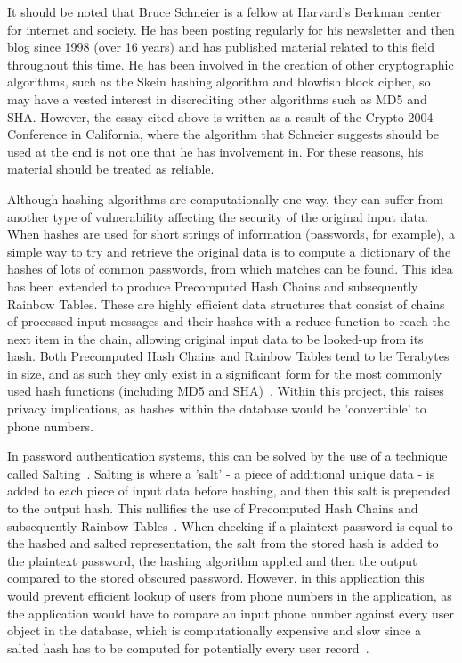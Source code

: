 \documentclass[authoryearcitations]{UoYCSproject}
\begin{document}
It should be noted that Bruce Schneier is a fellow at Harvard's Berkman center for internet and society.  He has been posting regularly for his newsletter and then blog since 1998 (over 16 years) and has published material related to this field throughout this time.  He has been involved in the creation of other cryptographic algorithms, such as the Skein hashing algorithm and blowfish block cipher, so may have a vested interest in discrediting other algorithms such as MD5 and SHA.  However, the essay cited above is written as a result of the Crypto 2004 Conference in California, where the algorithm that Schneier suggests should be used at the end is not one that he has involvement in.  For these reasons, his material should be treated as reliable.

Although hashing algorithms are computationally one-way, they can suffer from another type of vulnerability affecting the security of the original input data.  When hashes are used for short strings of information (passwords, for example), a simple way to try and retrieve the original data is to compute a dictionary of the hashes of lots of common passwords, from which matches can be found.  This idea has been extended to produce Precomputed Hash Chains and subsequently Rainbow Tables.  These are highly efficient data structures that consist of chains of processed input messages and their hashes with a reduce function to reach the next item in the chain, allowing original input data to be looked-up from its hash.  Both Precomputed Hash Chains and Rainbow Tables tend to be Terabytes in size, and as such they only exist in a significant form for the most commonly used hash functions (including MD5 and SHA)~\cite{Teat:2011:SCH:2016039.2016072}.  Within this project, this raises privacy implications, as hashes within the database would be 'convertible' to phone numbers.

In password authentication systems, this can be solved by the use of a technique called Salting~\cite{hashingPasswordsInfoSec}.  Salting is where a 'salt' - a piece of additional unique data - is added to each piece of input data before hashing, and then this salt is prepended to the output hash.  This nullifies the use of Precomputed Hash Chains and subsequently Rainbow Tables~\cite{hashingPasswordsInfoSec}. When checking if a plaintext password is equal to the hashed and salted representation, the salt from the stored hash is added to the plaintext password, the hashing algorithm applied and then the output compared to the stored obscured password. However, in this application this would prevent efficient lookup of users from phone numbers in the application, as the application would have to compare an input phone number against every user object in the database, which is computationally expensive and slow since a salted hash has to be computed for potentially every user record~\cite{hashingPasswordsInfoSec}.  
\end{document}
